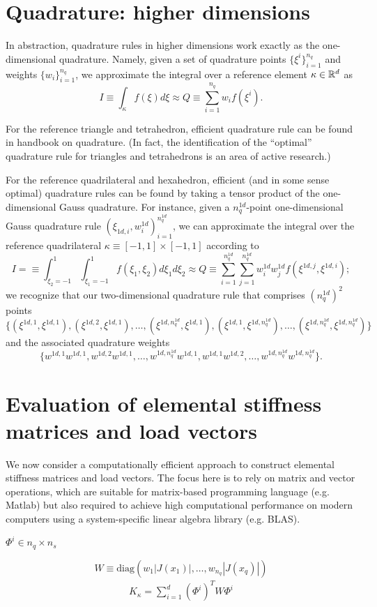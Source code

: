 \section{Quadrature: higher dimensions}
In abstraction, quadrature rules in higher dimensions work exactly as the one-dimensional quadrature. Namely, given a set of quadrature points $\{\xi^i\}_{i=1}^{n_q}$ and weights $\{w_i\}_{i=1}^{n_q}$, we approximate the integral over a reference element $\kappa \in \mathbb{R}^d$ as
\begin{equation*}
  I \equiv \int_{\kappa} f(\xi) d\xi \approx Q \equiv \sum_{i=1}^{n_q} w_i f(\xi^i).
\end{equation*}

For the reference triangle and tetrahedron, efficient quadrature rule can be found in handbook on quadrature.  (In fact, the identification of the ``optimal'' quadrature rule for triangles and tetrahedrons is an area of active research.)

For the reference quadrilateral and hexahedron, efficient (and in some sense optimal) quadrature rules can be found by taking a tensor product of the one-dimensional Gauss quadrature.  For instance, given a $n^{1d}_{q}$-point one-dimensional Gauss quadrature rule $(\xi_{1d,i},w^{1d}_i)_{i=1}^{n^{1d}_q}$, we can approximate the integral over the reference quadrilateral $\kappa \equiv [-1,1] \times [-1,1]$ according to
\begin{equation*}
  I
  = \equiv \int_{\xi_2 = -1}^1 \int_{\xi_1 = -1}^1 f(\xi_1,\xi_2) d\xi_1 d\xi_2
  \approx Q \equiv \sum_{i = 1}^{n^{1d}_q}  \sum_{j=1}^{n^{1d}_q} w^{1d}_i w^{1d}_j f(\xi^{1d,j},\xi^{1d,i});
\end{equation*}
we recognize that our two-dimensional quadrature rule that comprises $(n^{1d}_q)^2$ points 
\begin{equation*}
  \{(\xi^{1d,1},\xi^{1d,1}), (\xi^{1d,2},\xi^{1d,1}), \dots, (\xi^{1d,n^{1d}_q},\xi^{1d,1}), (\xi^{1d,1},\xi^{1d,n^{1d}_q}), \dots, (\xi^{1d,n^{1d}_q}, \xi^{1d,n^{1d}_q}) \}
\end{equation*}
and the associated quadrature weights
\begin{equation*}
  \{ w^{1d,1}w^{1d,1}, w^{1d,2}w^{1d,1}, \dots, w^{1d,n^{1d}_q}w^{1d,1}, w^{1d,1}w^{1d,2}, \dots, w^{1d,n^{1d}_q}w^{1d,n^{1d}_q} \}.
\end{equation*}

\section{Evaluation of elemental stiffness matrices and load vectors}
We now consider a computationally efficient approach to construct elemental stiffness matrices and load vectors.  The focus here is to rely on matrix and vector operations, which are suitable for matrix-based programming language (e.g. Matlab) but also required to achieve high computational performance on modern computers using a system-specific linear algebra library (e.g. BLAS).



$\Phi^i \in n_q \times n_s$

\begin{equation*}
  W \equiv \text{diag}(w_1 |J(x_1)|, \dots, w_{n_q} |J(x_q)|)
\end{equation*}
\begin{align*}
  K_\kappa = \sum_{i=1}^d (\Phi^i)^T W \Phi^i 
\end{align*}
